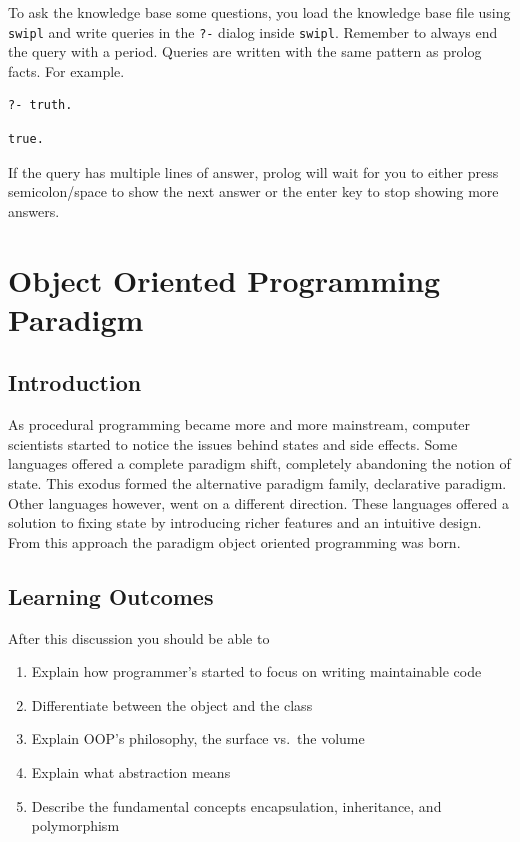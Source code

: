 To ask the knowledge base some questions, you load the knowledge base
file using \texttt{swipl} and write queries in the \texttt{?-} dialog
inside \texttt{swipl}. Remember to always end the query with a period.
Queries are written with the same pattern as prolog facts. For example.

\begin{verbatim}
?- truth.
\end{verbatim}

\begin{verbatim}
true.
\end{verbatim}

If the query has multiple lines of answer, prolog will wait for you to
either press semicolon/space to show the next answer or the enter key to
stop showing more answers.

\chapter{Object Oriented Programming
Paradigm}\label{object-oriented-programming-paradigm.md__object-oriented-programming-paradigm}

\section{Introduction}\label{object-oriented-programming-paradigm.md__introduction}

As procedural programming became more and more mainstream, computer
scientists started to notice the issues behind states and side effects.
Some languages offered a complete paradigm shift, completely abandoning
the notion of state. This exodus formed the alternative paradigm family,
declarative paradigm. Other languages however, went on a different
direction. These languages offered a solution to fixing state by
introducing richer features and an intuitive design. From this approach
the paradigm object oriented programming was born.

\section{Learning
Outcomes}\label{object-oriented-programming-paradigm.md__learning-outcomes}

After this discussion you should be able to

\begin{enumerate}
\def\labelenumi{\arabic{enumi}.}
\tightlist
\item
  Explain how programmer's started to focus on writing maintainable code
\item
  Differentiate between the object and the class
\item
  Explain OOP's philosophy, the surface vs.~the volume
\item
  Explain what abstraction means
\item
  Describe the fundamental concepts encapsulation, inheritance, and
  polymorphism
\end{enumerate}

